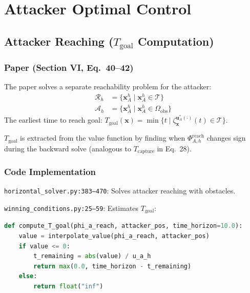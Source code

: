 \documentclass[11pt,a4paper]{article}
\begin{document}
\section{Attacker Optimal Control}

\subsection{Attacker Reaching ($T_{\mathrm{goal}}$ Computation)}

\subsubsection{Paper (Section VI, Eq.~40--42)}

The paper solves a separate reachability problem for the attacker:
\begin{align}
\mathcal{R}_h &= \{\mathbf{x}^h_A \mid \mathbf{x}^h_A \in \mathcal{T}\} \\
\mathcal{A}_h &= \{\mathbf{x}^h_A \mid \mathbf{x}^h_A \in \Omega_{\mathrm{obs}}\}
\end{align}
The earliest time to reach goal: $T_{\mathrm{goal}}(\mathbf{x}) = \min\{t \mid \zeta^{\mathbf{u}^*_A(\cdot)}_{\mathbf{x}}(t) \in \mathcal{T}\}$.

$T_{\mathrm{goal}}$ is extracted from the value function by finding when $\Phi^{\mathrm{reach}}_{A,h}$ changes sign during the backward solve (analogous to $T_{\mathrm{capture}}$ in Eq.~28).

\subsubsection{Code Implementation}

\texttt{horizontal\_solver.py:383--470}: Solves attacker reaching with obstacles.

\texttt{winning\_conditions.py:25--59}: Estimates $T_{\mathrm{goal}}$:
\begin{lstlisting}[language=Python]
def compute_T_goal(phi_a_reach, attacker_pos, time_horizon=10.0):
    value = interpolate_value(phi_a_reach, attacker_pos)
    if value <= 0:
        t_remaining = abs(value) / u_a_h
        return max(0.0, time_horizon - t_remaining)
    else:
        return float("inf")
\end{lstlisting}
\end{document}
